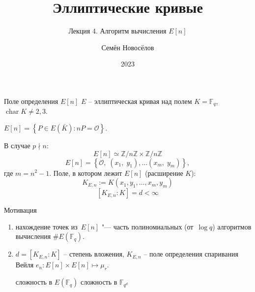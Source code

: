 \documentclass{beamer}
\title{Эллиптические кривые}
\subtitle{Лекция 4. Алгоритм вычисления $E[n]$}
\author{Семён Новосёлов}
\institute{БФУ им. И. Канта}
\date{2023}
\begin{document}
\frame{\titlepage}

\begin{frame}{Поле определения $E[n]$}
$E$ -- эллиптическая кривая над полем $K = \mathbb{F}_q$, $\operatorname{char}{K} \ne 2,3$.

\vspace{0.5em}
     $E[n] = \left\{ {P \in E\left( \bar{K} \right) : nP = \mathcal{O}} \right\}$.

    В случае $p \nmid n$:
    \[
    E\left[ n \right] \simeq \mathbb{Z}/n\mathbb{Z} \times \mathbb{Z}/n\mathbb{Z}
    \]
    \structure{
    \[\Downarrow\]
	}
    \[
    E\left[n\right] = \left\{ {\mathcal{O},\;\left( {{x_1},\;{y_1}} \right), ... \left( {{x_m},\;{y_m}} \right)} \right\},
    \]
    где $m=n^2-1$.
    \structure{
    \[\Downarrow\]
	}
    Поле, в котором лежит $E\left[ n \right]$ (расширение
    $K$):
    \[
    K_{E,n} := K\left( {{x_1}, {y_1}, \ldots, x_m, y_m} \right)
    \]
    \[
    \left[ K_{E,n} : K \right] = d < \infty 
    \]
\end{frame}

\begin{frame}{Мотивация}
    \begin{enumerate}
        \item нахождение точек из~$E[n]$ "--- часть полиномиальных (от~$\log{q}$) алгоритмов вычисления $\#E(\mathbb{F}_q)$.
        \item $d = [K_{E,n} : K]$ -- степень вложения, $K_{E,n}$ -- поле определения спаривания Вейля $e_n: E[n] \times E[n] \mapsto \mu_r$.
        \begin{center}
            \structure{$\Downarrow$}
        \end{center}
            сложность  в $E(\mathbb{F}_q)$ \structure{$\rightleftarrows$} сложность  в $\mathbb{F}_{q^{d}}$
    \end{enumerate}
\end{frame}
\end{document}
